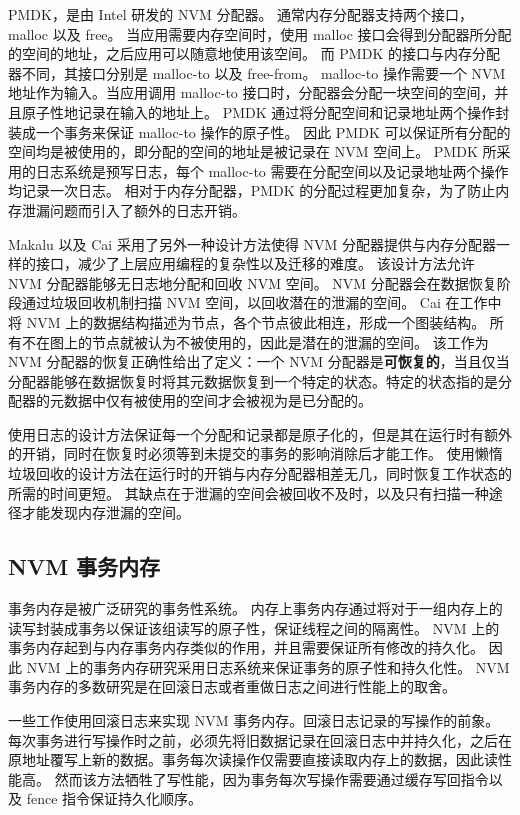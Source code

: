 PMDK，是由 Intel 研发的 NVM 分配器\cite{pmdk}。
通常内存分配器支持两个接口，malloc 以及 free。
当应用需要内存空间时，使用 malloc 接口会得到分配器所分配的空间的地址，之后应用可以随意地使用该空间。
而 PMDK 的接口与内存分配器不同，其接口分别是 malloc-to 以及 free-from。
malloc-to 操作需要一个 NVM 地址作为输入。当应用调用 malloc-to 接口时，分配器会分配一块空间的空间，并且原子性地记录在输入的地址上。
PMDK 通过将分配空间和记录地址两个操作封装成一个事务来保证 malloc-to 操作的原子性。
因此 PMDK 可以保证所有分配的空间均是被使用的，即分配的空间的地址是被记录在 NVM 空间上。
PMDK 所采用的日志系统是预写日志，每个 malloc-to 需要在分配空间以及记录地址两个操作均记录一次日志。
相对于内存分配器，PMDK 的分配过程更加复杂，为了防止内存泄漏问题而引入了额外的日志开销。

Makalu\cite{bhandari_makalu_2016} 以及 Cai\cite{cai_understanding_2020} 采用了另外一种设计方法使得 NVM 分配器提供与内存分配器一样的接口，减少了上层应用编程的复杂性以及迁移的难度。
该设计方法允许 NVM 分配器能够无日志地分配和回收 NVM 空间。
NVM 分配器会在数据恢复阶段通过垃圾回收机制扫描 NVM 空间，以回收潜在的泄漏的空间。
Cai 在工作中将 NVM 上的数据结构描述为节点，各个节点彼此相连，形成一个图装结构。
所有不在图上的节点就被认为不被使用的，因此是潜在的泄漏的空间。
该工作为 NVM 分配器的恢复正确性给出了定义：一个 NVM 分配器是\textbf{可恢复的}，当且仅当
分配器能够在数据恢复时将其元数据恢复到一个特定的状态。特定的状态指的是分配器的元数据中仅有被使用的空间才会被视为是已分配的。

使用日志的设计方法保证每一个分配和记录都是原子化的，但是其在运行时有额外的开销，同时在恢复时必须等到未提交的事务的影响消除后才能工作。
使用懒惰垃圾回收的设计方法在运行时的开销与内存分配器相差无几，同时恢复工作状态的所需的时间更短。
其缺点在于泄漏的空间会被回收不及时，以及只有扫描一种途径才能发现内存泄漏的空间。



\subsection{NVM 事务内存}

事务内存是被广泛研究的事务性系统。
内存上事务内存通过将对于一组内存上的读写封装成事务以保证该组读写的原子性，保证线程之间的隔离性。
NVM 上的事务内存起到与内存事务内存类似的作用，并且需要保证所有修改的持久化。
因此 NVM 上的事务内存研究采用日志系统来保证事务的原子性和持久化性。
NVM 事务内存的多数研究是在回滚日志或者重做日志之间进行性能上的取舍。

一些工作使用回滚日志来实现 NVM 事务内存\cite{coburn_nv-heaps_2011, kolli_high-performance_2016}。回滚日志记录的写操作的前象。每次事务进行写操作时之前，必须先将旧数据记录在回滚日志中并持久化，之后在原地址覆写上新的数据。事务每次读操作仅需要直接读取内存上的数据，因此读性能高。
然而该方法牺牲了写性能，因为事务每次写操作需要通过缓存写回指令以及 fence 指令保证持久化顺序。


